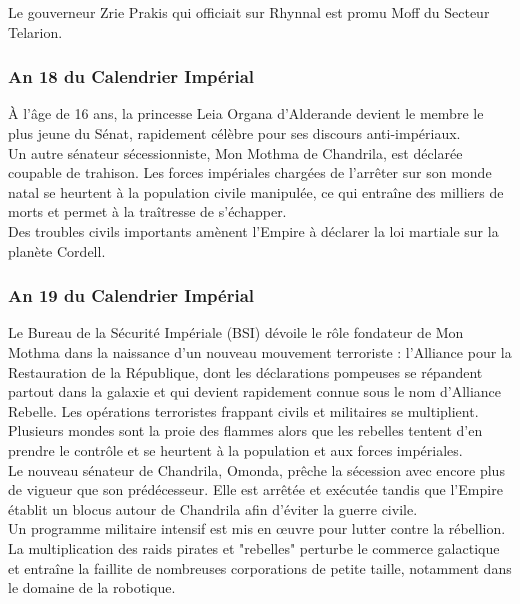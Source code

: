 \documentclass[twoside]{article}
\begin{document}
Le gouverneur Zrie Prakis qui officiait sur Rhynnal est promu Moff du Secteur Telarion.

\subsubsection*{An 18 du Calendrier Impérial}
À l’âge de 16 ans, la princesse Leia Organa d'Alderande devient le membre le plus jeune du Sénat, rapidement célèbre pour ses discours anti-impériaux.\\

Un autre sénateur sécessionniste, Mon Mothma de Chandrila, est déclarée coupable de trahison. Les forces impériales chargées de l'arrêter sur son monde natal se heurtent à la population civile manipulée, ce qui entra\^{i}ne des milliers de morts et permet à la tra\^{i}tresse de s'échapper.\\

Des troubles civils importants amènent l'Empire à déclarer la loi martiale sur la planète Cordell.

\subsubsection*{An 19 du Calendrier Impérial}
Le Bureau de la Sécurité Impériale (BSI) dévoile le rôle fondateur de Mon Mothma dans la naissance d'un nouveau mouvement terroriste : l'Alliance pour la Restauration de la République, dont les déclarations pompeuses se répandent partout dans la galaxie et qui devient rapidement connue sous le nom d'Alliance Rebelle. Les opérations terroristes frappant civils et militaires se multiplient. Plusieurs mondes sont la proie des flammes alors que les rebelles tentent d'en prendre le contrôle et se heurtent à la population et aux forces impériales.\\

Le nouveau sénateur de Chandrila, Omonda, prêche la sécession avec encore plus de vigueur que son prédécesseur. Elle est arrêtée et exécutée tandis que l'Empire établit un blocus autour de Chandrila afin d'éviter la guerre civile.\\

Un programme militaire intensif est mis en \oe uvre pour lutter contre la rébellion.\\

La multiplication des raids pirates et "rebelles" perturbe le commerce galactique et entra\^{i}ne la faillite de nombreuses corporations de petite taille, notamment dans le domaine de la robotique.\\
\end{document}
